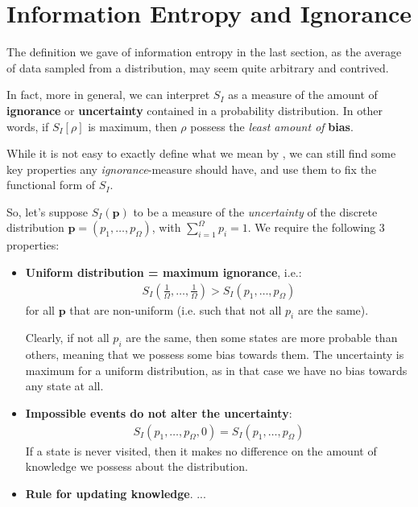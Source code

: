 \documentclass[../../main.tex]{subfiles}
\begin{document}


\section{Information Entropy and Ignorance}
The definition we gave of information entropy in the last section, as the average  of data sampled from a distribution, may seem quite arbitrary and contrived.

\medskip

In fact, more in general, we can interpret $S_I$ as a measure of the amount of \textbf{ignorance} or \textbf{uncertainty} contained in a probability distribution. In other words, if $S_I[\rho]$ is maximum, then $\rho$ possess the \textit{least amount of} \textbf{bias}.  

While it is not easy to exactly define what we mean by , we can still find some key properties any \textit{ignorance}-measure should have, and use them to fix the functional form of $S_I$.

\medskip

So, let's suppose $S_I(\bm{p})$ to be a measure of the \textit{uncertainty} of the discrete distribution $\bm{p} = (p_1, \dots, p_\Omega)$, with $\sum_{i=1}^{\Omega} p_i = 1$. We require the following $3$ properties:
\begin{itemize}
    \item \textbf{Uniform distribution = maximum ignorance}, i.e.:
    \begin{align} \label{eqn:key1}
        \displaystyle S_I \left(\frac{1}{\Omega}, \dots, \frac{1}{\Omega}  \right) > S_I (p_1, \dots, p_{\Omega})
    \end{align}
     for all $\bm{p}$ that are non-uniform (i.e. such that not all $p_i$ are the same).  

    \medskip

    Clearly, if not all $p_i$ are the same, then some states are more probable than others, meaning that we possess some bias towards them. The uncertainty is maximum for a uniform distribution, as in that case we have no bias towards any state at all.

    \item \textbf{Impossible events do not alter the uncertainty}:
    \begin{align*}
        S_I(p_1, \dots, p_{\Omega},0) = S_I(p_1, \dots, p_{\Omega})
    \end{align*} 
    If a state is never visited, then it makes no difference on the amount of knowledge we possess about the distribution.

    \item \textbf{Rule for updating knowledge}. ... 
\end{itemize}
\end{document}
